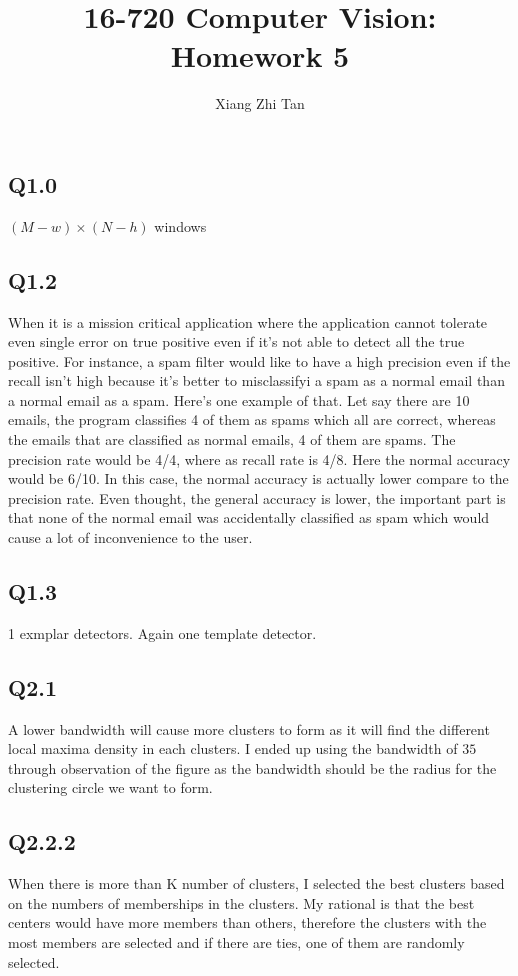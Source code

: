 \documentclass{article}
\begin{document}
\title{16-720 Computer Vision: Homework 5}
\author{Xiang Zhi Tan}

\maketitle
\subsection*{Q1.0}
$(M - w) \times (N - h)$ windows

\subsection*{Q1.2}
When it is a mission critical application where the application cannot tolerate even single error on true positive even if it's not able to detect all the true positive. For instance, a spam filter would like to have a high precision even if the recall isn't high because it's better to misclassifyi a spam as a normal email than a normal email as a spam. Here's one example of that. Let say there are 10 emails, the program classifies 4 of them as spams which all are correct, whereas the emails that are classified as normal emails, 4 of them are spams. The precision rate would be 4/4, where as recall rate is 4/8. Here the normal accuracy would be 6/10. In this case, the normal accuracy is actually lower compare to the precision rate. Even thought, the general accuracy is lower, the important part is that none of the normal email was accidentally classified as spam which would cause a lot of inconvenience to the user.

\subsection*{Q1.3}
1 exmplar detectors. Again one template detector.


\subsection*{Q2.1}
A lower bandwidth will cause more clusters to form as it will find the different local maxima density in each clusters. I ended up using the bandwidth of $35$ through observation of the figure as the bandwidth should be the radius for the clustering circle we want to form.

\subsection*{Q2.2.2}
When there is more than K number of clusters, I selected the best clusters based on the numbers of memberships in the clusters. My rational is that the best centers would have more members than others, therefore the clusters with the most members are selected and if there are ties, one of them are randomly selected.
\end{document}
